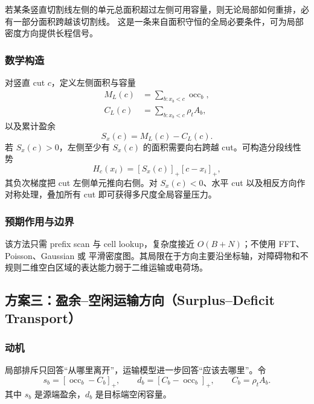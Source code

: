 \documentclass[UTF8,a4paper,11pt]{ctexart}
\newcommand{\pos}[1]{\left[#1\right]_{+}}
\begin{document}
若某条竖直切割线左侧的单元总面积超过左侧可用容量，则无论局部如何重排，必有一部分面积跨越该切割线。
这是一条来自面积守恒的全局必要条件，可为局部密度方向提供长程信号。

\subsubsection{数学构造}

对竖直 cut $c$，定义左侧面积与容量
\begin{align}
  M_L(c)&=\sum_{b:x_b<c}\operatorname{occ}_b,\\
  C_L(c)&=\sum_{b:x_b<c}\rho_tA_b,
\end{align}
以及累计盈余
\begin{equation}
  S_x(c)=M_L(c)-C_L(c).
  \label{eq:cut-surplus}
\end{equation}
若 $S_x(c)>0$，左侧至少有 $S_x(c)$ 的面积需要向右跨越 cut。可构造分段线性势
\begin{equation}
  H_c(x_i)=\pos{S_x(c)}\pos{c-x_i},
  \label{eq:cut-potential}
\end{equation}
其负次梯度把 cut 左侧单元推向右侧。对 $S_x(c)<0$、水平 cut 以及相反方向作对称处理，叠加所有 cut
即可获得多尺度全局容量压力。

\subsubsection{预期作用与边界}

该方法只需 prefix scan 与 cell lookup，复杂度接近 $O(B+N)$；不使用 FFT、Poisson、Gaussian 或
平滑密度图。其局限在于方向主要沿坐标轴，对障碍物和不规则二维空白区域的表达能力弱于二维运输或电荷场。

\subsection{方案三：盈余--空闲运输方向（Surplus--Deficit Transport）}

\subsubsection{动机}

局部排斥只回答“从哪里离开”，运输模型进一步回答“应该去哪里”。令
\begin{equation}
  s_b=\pos{\operatorname{occ}_b-C_b},
  \qquad
  d_b=\pos{C_b-\operatorname{occ}_b},
  \qquad C_b=\rho_tA_b.
  \label{eq:supply-demand}
\end{equation}
其中 $s_b$ 是源端盈余，$d_b$ 是目标端空闲容量。
\end{document}
